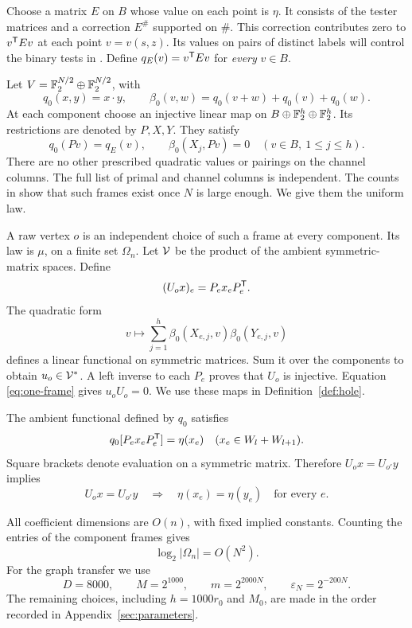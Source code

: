 Choose a matrix \(E\) on \(B\) whose value on each point is \(\eta\).
It consists of the tester matrices and a correction \(E^\#\) supported
on \(\#\). This correction contributes zero to \(v^{\mathsf T} Ev\) at each
point \(v=v(s,z)\). Its values on pairs of distinct labels will control
the binary tests in . Define \(q_E(v)=v^{\mathsf T} Ev\) for
\emph{every} \(v\in B\).

Let \(V=\mathbb F_2^{N/2}\oplus\mathbb F_2^{N/2}\), with
\[
 q_0(x,y)=x\cdot y,
 \qquad \beta_0(v,w)=q_0(v+w)+q_0(v)+q_0(w).
\]
At each component choose an injective linear map on
\(B\oplus\mathbb F_2^h\oplus\mathbb F_2^h\). Its restrictions are denoted by \(P,X,Y\).
They satisfy
\begin{equation}\label{eq:one-frame}
 q_0(Pv)=q_E(v),\qquad \beta_0(X_j,Pv)=0
 \quad(v\in B,\ 1\le j\le h).
\end{equation}
There are no other prescribed quadratic values or pairings on the channel
columns. The full list of primal and channel columns is independent.
The counts in  show that such frames exist once
\(N\) is large enough. We give them the uniform law.

A raw vertex \(o\) is an independent choice of such a frame at every
component. Its law is \(\mu\), on a finite set \(\Omega_n\).
Let \(\mathcal V\) be the product of the ambient symmetric-matrix spaces. Define
\[
 (U_ox)_e=P_ex_eP_e^{\mathsf T}.
\]
The quadratic form
\[
 v\longmapsto\sum_{j=1}^h\beta_0(X_{e,j},v)\beta_0(Y_{e,j},v)
\]
defines a linear functional on symmetric matrices. Sum it over the
components to obtain \(u_o\in\mathcal V^*\).
A left inverse to each \(P_e\) proves that \(U_o\) is injective.
Equation \eqref{eq:one-frame} gives \(u_oU_o=0\).
We use these maps in Definition~\ref{def:hole}.

The ambient functional defined by \(q_0\) satisfies
\[
 q_0[P_ex_eP_e^{\mathsf T}]=\eta(x_e)\quad(x_e\in W_l+W_{l+1}).
\]
Square brackets denote evaluation on a symmetric matrix. Therefore
\(U_ox=U_{o'}y\) implies
\begin{equation}\label{eq:common-image-tester}
 U_ox=U_{o'}y\quad\Longrightarrow\quad\eta(x_e)=\eta(y_e)\quad\text{for every }e.
\end{equation}

All coefficient dimensions are \(O(n)\), with fixed implied constants.
Counting the entries of the component frames gives
\begin{equation}\label{eq:raw-space-size}
 \log_2|\Omega_n|=O(N^2).
\end{equation}
For the graph transfer we use
\[
 D=8000,\qquad M=2^{1000},\qquad m=2^{2000N},\qquad
 \varepsilon_N=2^{-200N}.
\]
The remaining choices, including \(h=1000r_0\) and \(M_0\), are made
in the order recorded in Appendix~\ref{sec:parameters}.
